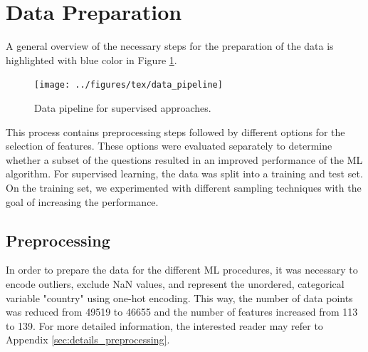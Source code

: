 \documentclass[10pt]{article}
\begin{document}
	
	\section{Data Preparation}
	A general overview of the necessary steps for the preparation of the data is highlighted with blue color in Figure \ref{fig:data_pipeline}.
	\begin{figure}[h]
		\centering
		\texttt{[image: ../figures/tex/data\_pipeline]}
		\caption{Data pipeline for supervised approaches.}
		\label{fig:data_pipeline}
	\end{figure}
	This process contains preprocessing steps followed by different options for the selection of features. These options were evaluated separately to determine whether a subset of the questions resulted in an improved performance of the ML algorithm. For supervised learning, the data was split into a training and test set. On the training set, we experimented with different sampling techniques with the goal of increasing the performance.
	
	\subsection{Preprocessing}
	In order to prepare the data for the different ML procedures, it was necessary to encode outliers, exclude NaN values, and represent the unordered, categorical variable "country" using one-hot encoding. This way, the number of data points was reduced from 49519 to 46655 and the number of features increased from 113 to 139. For more detailed information, the interested reader may refer to Appendix \ref{sec:details_preprocessing}.
	
\end{document}
